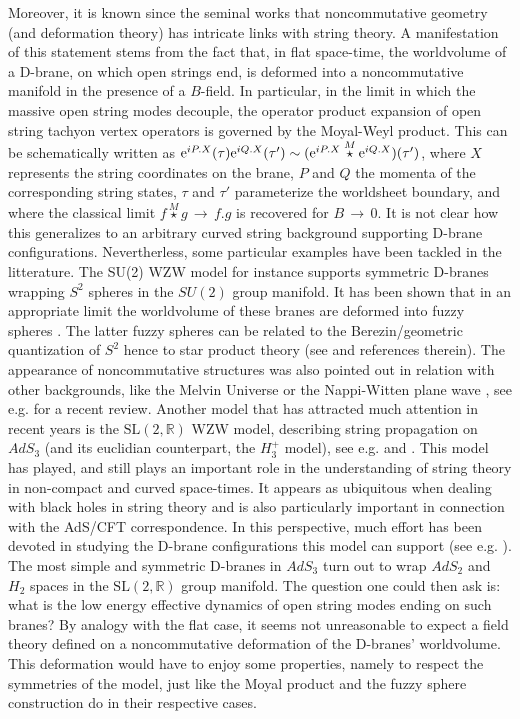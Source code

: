\documentclass{article}
\newcommand{\SL}{\mbox{SL}(2,\mathbb{R})}
\def \ra{{\, \rightarrow \,}}
\begin{document}
\noindent Moreover, it is known since the seminal works \cite{ConnesDouglas,SeibWitt} that noncommutative geometry (and deformation theory) has intricate links with string theory. A manifestation of this statement stems from the fact that, in flat space-time, the worldvolume of a D-brane, on which open strings end, is deformed into a noncommutative manifold in the presence of a $B$-field. In particular, in the limit in which the massive open string modes decouple, the operator product expansion of open string tachyon vertex operators is governed by the Moyal-Weyl product\cite{SeibWitt, SchomDefQ}. This can be schematically written as
$ {\rm e}^{i P.X}(\tau)  {\rm e}^{i Q.X}(\tau') \sim ({\rm e}^{i P.X} \overset{M}{\star} {\rm e}^{i Q.X})(\tau')$, where $X$ represents the string coordinates on the brane, $P$ and $Q$ the momenta of the corresponding string states, $\tau$ and $\tau'$ parameterize the worldsheet boundary, and where the classical limit $f \overset{M}{\star} g \ra f.g$ is recovered for $B \ra 0$. It is not clear how this generalizes to an arbitrary curved string background supporting D-brane configurations. Nevertherless, some particular examples have been tackled in the litterature. The SU(2) WZW model for instance supports symmetric D-branes wrapping $S^2$ spheres in the $SU(2)$ group manifold. It has been shown that in an appropriate limit the worldvolume of these branes are deformed into fuzzy spheres \cite{AleksReckSchom2, AleksReckSchom1, AleksReckSchom3, Schomerus:2002dc}. The latter fuzzy spheres can be related to the Berezin/geometric quantization
of $S^2$ hence to star product theory (see \cite{PierreJan} and references therein). The appearance of noncommutative structures was also pointed out in relation with other backgrounds, like the Melvin Universe \cite{Hashimoto:2005hy,Hashimoto:2002nr,Halliday:2006qc,Behr:2003qc,Cai:2002sv,Cai:2006td,Cai:1999aw} or the Nappi-Witten plane wave \cite{Halliday:2006qc,Halliday:2005zt}, see e.g. \cite{Szabo:2006wx} for a recent review. Another model that has attracted much attention in recent years is the $\SL$ WZW model, describing string propagation on $AdS_3$ (and its euclidian counterpart, the $H_3^+$ model), see e.g. \cite{MO} and \cite{Teschner1}. This model has played, and still plays an important role in the understanding of string theory in non-compact and curved space-times. It appears as ubiquitous when dealing with black holes in string theory and is also particularly important in connection with the AdS/CFT correspondence. In this perspective, much effort has been devoted in studying the D-brane configurations this model can support (see e.g. \cite{Bachas:2000fr}). The most simple and symmetric D-branes in $AdS_3$ turn out to wrap $AdS_2$ and $H_2$ spaces in the $\SL$ group manifold. The question 
one could then ask is: what is the low energy effective dynamics of open string modes ending on such branes? By analogy with the flat case, it seems not unreasonable to expect a field theory defined on a noncommutative deformation of the D-branes' worldvolume. This deformation would have to enjoy some properties, namely to respect the symmetries of the model, just like the Moyal product and the fuzzy sphere construction do in their respective cases. 
\end{document}
